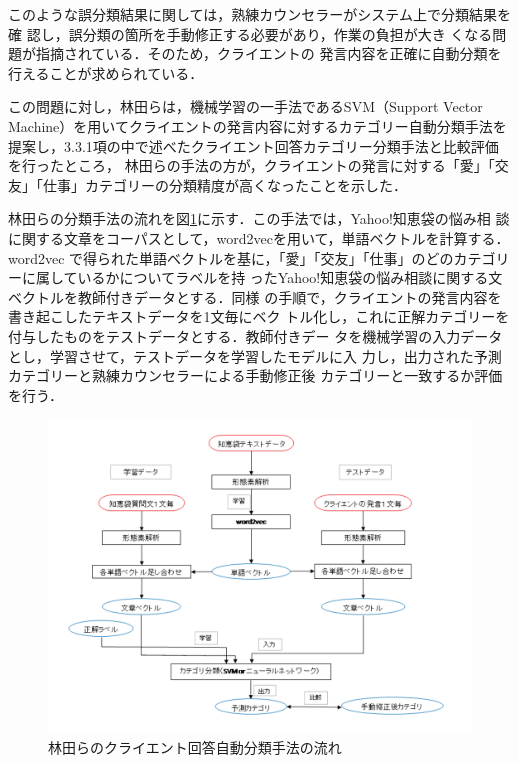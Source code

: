 \documentclass[shuuron]{kuee}
\begin{document}
このような誤分類結果に関しては，熟練カウンセラーがシステム上で分類結果を確
認し，誤分類の箇所を手動修正する必要があり，作業の負担が大き
くなる問題が指摘されている．そのため，クライエントの
発言内容を正確に自動分類を行えることが求められている．

この問題に対し，林田ら\cite{hayashidaEn}は，機械学習の一手法であるSVM（Support Vector Machine）を用いてクライエントの発言内容に対するカテゴリー自動分類手法を
提案し，3.3.1項の中で述べたクライエント回答カテゴリー分類手法と比較評価を行ったところ，
林田らの手法の方が，クライエントの発言に対する「愛」「交友」「仕事」カテゴリーの分類精度が高くなったことを示した．

林田らの分類手法の流れを図\ref{fig:flowHayashida}に示す．この手法では，Yahoo!知恵袋の悩み相
談に関する文章をコーパスとして，word2vec\cite{mikolov2013efficient}を用いて，単語ベクトルを計算する．word2vec
で得られた単語ベクトルを基に，「愛」「交友」「仕事」のどのカテゴリーに属しているかについてラベルを持
ったYahoo!知恵袋の悩み相談に関する文ベクトルを教師付きデータとする．同様
の手順で，クライエントの発言内容を書き起こしたテキストデータを1文毎にベク
トル化し，これに正解カテゴリーを付与したものをテストデータとする．教師付きデー
タを機械学習の入力データとし，学習させて，テストデータを学習したモデルに入
力し，出力された予測カテゴリーと熟練カウンセラーによる手動修正後
カテゴリーと一致するか評価を行う．

\begin{figure}
  \begin{center}
    \includegraphics[width=\linewidth]{flowHayashida.png}
  \end{center}
  \caption{林田らのクライエント回答自動分類手法の流れ}
  \label{fig:flowHayashida}
\end{figure}
\end{document}

